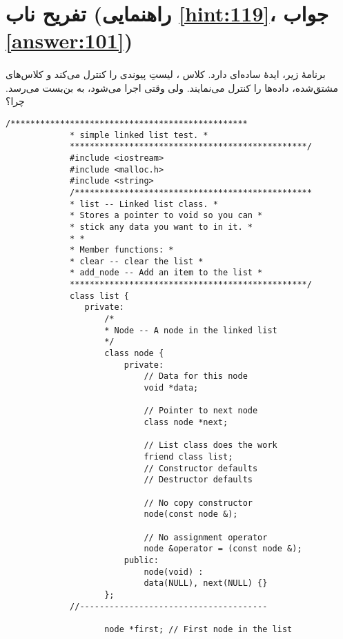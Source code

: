 \section[تفریح ناب]{تفریح ناب \protect{} (راهنمایی \ref{hint:119}، جواب \ref{answer:101})}
\paragraph{}\label{prog:96}
برنامهٔ زیر، ایدهٔ ساده‌ای دارد. کلاس ، لیستِ پیوندی را کنترل می‌کند و کلاس‌های مشتق‌شده، داده‌ها را کنترل می‌نمایند. ولی وقتی اجرا می‌شود، به بن‌بست می‌رسد. چرا؟

\begin{LTR}
        \begin{lstlisting}[style=C++Style]
             /************************************************
             * simple linked list test. *
             ************************************************/
             #include <iostream>
             #include <malloc.h>
             #include <string>
             /************************************************
             * list -- Linked list class. *
             * Stores a pointer to void so you can *
             * stick any data you want to in it. *
             * *
             * Member functions: *
             * clear -- clear the list *
             * add_node -- Add an item to the list *
             ************************************************/
             class list {
             	private:
             		/*
             		* Node -- A node in the linked list
             		*/
             		class node {
             			private:
             				// Data for this node
             				void *data;

             				// Pointer to next node
             				class node *next;

             				// List class does the work
             				friend class list;
             				// Constructor defaults
             				// Destructor defaults

             				// No copy constructor
             				node(const node &);

             				// No assignment operator
             				node &operator = (const node &);
             			public:
             				node(void) :
             				data(NULL), next(NULL) {}
             		};
             //--------------------------------------

             		node *first; // First node in the list


\end{lstlisting}
\end{LTR}
